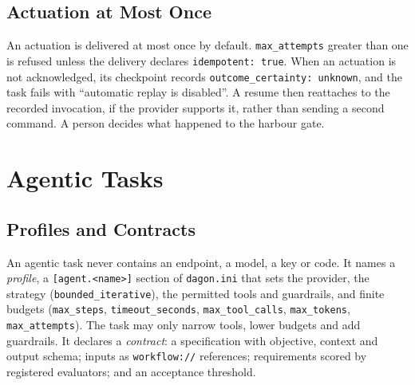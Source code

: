 \subsection{Actuation at Most Once}





\begin{cautionbox}
An actuation is delivered at most once by default. \texttt{max\_attempts}
greater than one is refused unless the delivery declares
\texttt{idempotent: true}. When an actuation is not acknowledged, its
checkpoint records \texttt{outcome\_certainty: unknown}, and the task fails
with ``automatic replay is disabled''. A resume then reattaches to the
recorded invocation, if the provider supports it, rather than sending a
second command. A person decides what happened to the harbour gate.
\end{cautionbox}

\section{Agentic Tasks}

\subsection{Profiles and Contracts}

An agentic task never contains an endpoint, a model, a key or code. It names
a \emph{profile}, a \texttt{[agent.<name>]} section of \texttt{dagon.ini} that
sets the provider, the strategy (\texttt{bounded\_iterative}), the permitted
tools and guardrails, and finite budgets (\texttt{max\_steps},
\texttt{timeout\_seconds}, \texttt{max\_tool\_calls}, \texttt{max\_tokens},
\texttt{max\_attempts}). The task may only narrow tools, lower budgets and
add guardrails. It declares a \emph{contract}: a specification with
objective, context and output schema; inputs as \texttt{workflow://}
references; requirements scored by registered evaluators; and an acceptance
threshold.




